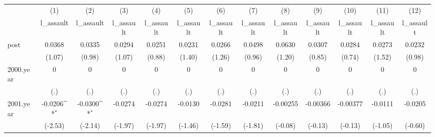 {
\def\sym#1{\ifmmode^{#1}\else\(^{#1}\)\fi}
\begin{tabular}{l*{12}{c}}
\hline\hline
            &\multicolumn{1}{c}{(1)}&\multicolumn{1}{c}{(2)}&\multicolumn{1}{c}{(3)}&\multicolumn{1}{c}{(4)}&\multicolumn{1}{c}{(5)}&\multicolumn{1}{c}{(6)}&\multicolumn{1}{c}{(7)}&\multicolumn{1}{c}{(8)}&\multicolumn{1}{c}{(9)}&\multicolumn{1}{c}{(10)}&\multicolumn{1}{c}{(11)}&\multicolumn{1}{c}{(12)}\\
            &\multicolumn{1}{c}{l\_assault}&\multicolumn{1}{c}{l\_assault}&\multicolumn{1}{c}{l\_assault}&\multicolumn{1}{c}{l\_assault}&\multicolumn{1}{c}{l\_assault}&\multicolumn{1}{c}{l\_assault}&\multicolumn{1}{c}{l\_assault}&\multicolumn{1}{c}{l\_assault}&\multicolumn{1}{c}{l\_assault}&\multicolumn{1}{c}{l\_assault}&\multicolumn{1}{c}{l\_assault}&\multicolumn{1}{c}{l\_assault}\\
\hline
post        &      0.0368         &      0.0335         &      0.0294         &      0.0251         &      0.0231         &      0.0266         &      0.0498         &      0.0630         &      0.0307         &      0.0284         &      0.0273         &      0.0232         \\
            &      (1.07)         &      (0.98)         &      (1.07)         &      (0.88)         &      (1.40)         &      (1.26)         &      (0.96)         &      (1.20)         &      (0.85)         &      (0.74)         &      (1.52)         &      (0.98)         \\
[1em]
2000.year   &           0         &           0         &           0         &           0         &           0         &           0         &           0         &           0         &           0         &           0         &           0         &           0         \\
            &         (.)         &         (.)         &         (.)         &         (.)         &         (.)         &         (.)         &         (.)         &         (.)         &         (.)         &         (.)         &         (.)         &         (.)         \\
[1em]
2001.year   &     -0.0206\sym{*}  &     -0.0300\sym{*}  &     -0.0274         &     -0.0274         &     -0.0130         &     -0.0281         &     -0.0211         &    -0.00255         &    -0.00366         &    -0.00377         &     -0.0111         &     -0.0205         \\
            &     (-2.53)         &     (-2.14)         &     (-1.97)         &     (-1.97)         &     (-1.46)         &     (-1.59)         &     (-1.81)         &     (-0.08)         &     (-0.13)         &     (-0.13)         &     (-1.05)         &     (-0.60)         \\

\end{tabular}}
